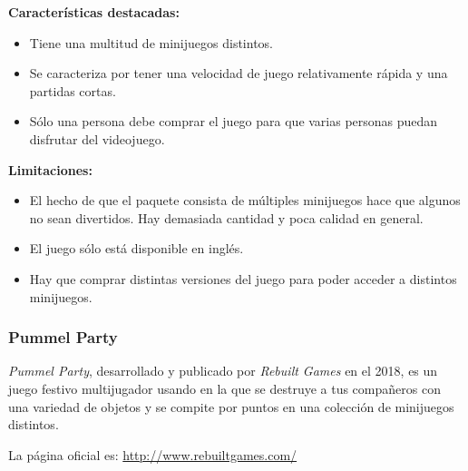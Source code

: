 \textbf{Características destacadas:}
\begin{itemize}
    \item Tiene una multitud de minijuegos distintos.
    \item Se caracteriza por tener una velocidad de juego relativamente rápida y
    una partidas cortas.
    \item Sólo una persona debe comprar el juego para que varias personas puedan
    disfrutar del videojuego.
\end{itemize}

\textbf{Limitaciones:}
\begin{itemize}
    \item El hecho de que el paquete consista de múltiples minijuegos hace que
    algunos no sean divertidos. Hay demasiada cantidad y poca calidad en
    general.
    \item El juego sólo está disponible en inglés.
    \item Hay que comprar distintas versiones del juego para poder acceder a
    distintos minijuegos.
\end{itemize}

\subsubsection{Pummel Party}
\emph{Pummel Party}, desarrollado y publicado por \emph{Rebuilt Games} en el
2018, es un juego festivo multijugador usando en la que se destruye a tus
compañeros con una variedad de objetos y se compite por puntos en una colección
de minijuegos distintos.

La página oficial es: %
\url{http://www.rebuiltgames.com/}

